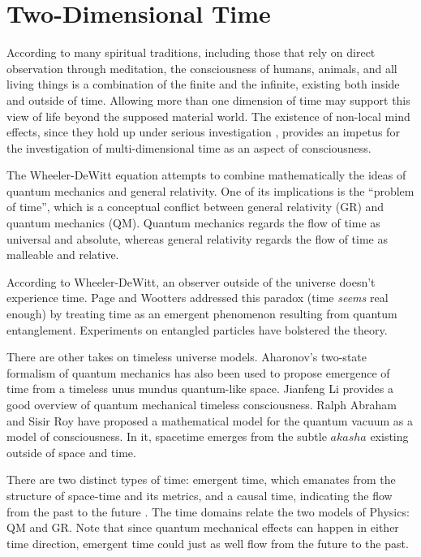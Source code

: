\section{\label{sec:level1}Two-Dimensional Time}

According to many spiritual traditions, including those that rely on
direct observation through meditation, the consciousness of humans, animals,
and all living things is a combination of the finite and the infinite,
existing both inside and outside of time.
Allowing more than one dimension of time may support this view
of life beyond the supposed material world.
The existence of non-local mind effects, since they hold up under serious
investigation \cite{Kelly}, provides an impetus for the investigation of
multi-dimensional time as an aspect of consciousness.

The Wheeler-DeWitt equation \cite{DeWitt} attempts to combine mathematically
the ideas of quantum mechanics and general relativity.
One of its implications is the ``problem of time'',
which is a conceptual conflict between general relativity (GR)
and quantum mechanics (QM).
Quantum mechanics regards the flow of time as universal and absolute, whereas
general relativity regards the flow of time as malleable and relative.

According to Wheeler-DeWitt, an observer outside of the universe
doesn't experience time. Page and Wootters \cite{Page} addressed this paradox
(time \textit{seems} real enough) by treating time as an emergent phenomenon
resulting from quantum entanglement.
Experiments \cite{Moreva} on entangled particles have bolstered the theory.

There are other takes on timeless universe models.
Aharonov's two-state formalism of quantum mechanics has also been used
\cite{Lobo} to propose emergence of time from a timeless unus mundus
quantum-like space.
Jianfeng Li provides a good overview \cite{Jianfeng} of quantum mechanical
timeless consciousness.
Ralph Abraham and Sisir Roy \cite{AbrahamRoy} have proposed a
mathematical model for the quantum vacuum as a model of consciousness.
In it, spacetime emerges from the subtle $akasha$
existing outside of space and time. 

There are two distinct types of time: emergent time, which emanates from the
structure of space-time and its metrics, and a causal time, indicating the flow
from the past to the future \cite{Brunet}. The time domains relate the
two models of Physics: QM and GR. 
Note that since quantum mechanical effects can happen in either time direction,
emergent time could just as well flow from the future to the past.

